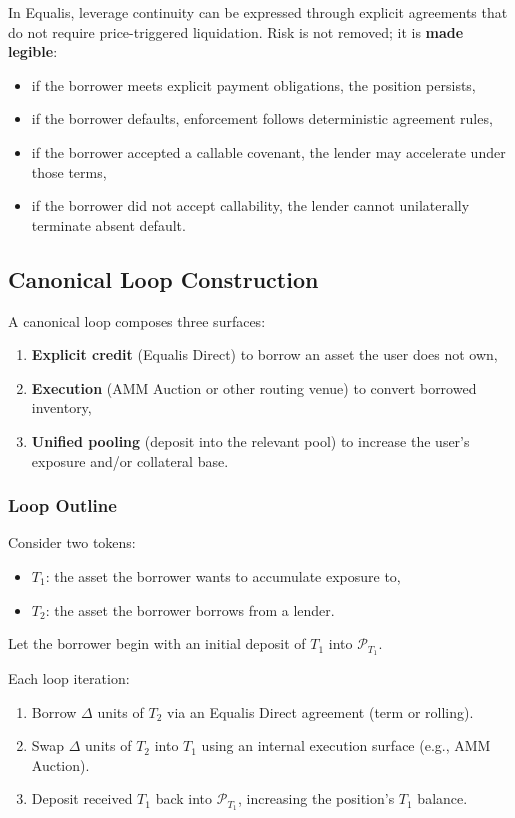 \documentclass[version=preprint]{iacrcc}
\begin{document}
In Equalis, leverage continuity can be expressed through explicit agreements that do not require price-triggered liquidation. Risk is not removed; it is \textbf{made legible}:
\begin{itemize}
  \item if the borrower meets explicit payment obligations, the position persists,
  \item if the borrower defaults, enforcement follows deterministic agreement rules,
  \item if the borrower accepted a callable covenant, the lender may accelerate under those terms,
  \item if the borrower did not accept callability, the lender cannot unilaterally terminate absent default.
\end{itemize}

\subsection{Canonical Loop Construction}

A canonical loop composes three surfaces:
\begin{enumerate}
  \item \textbf{Explicit credit} (Equalis Direct) to borrow an asset the user does not own,
  \item \textbf{Execution} (AMM Auction or other routing venue) to convert borrowed inventory,
  \item \textbf{Unified pooling} (deposit into the relevant pool) to increase the user’s exposure and/or collateral base.
\end{enumerate}

\subsubsection{Loop Outline}

Consider two tokens:
\begin{itemize}
  \item $T_1$: the asset the borrower wants to accumulate exposure to,
  \item $T_2$: the asset the borrower borrows from a lender.
\end{itemize}

Let the borrower begin with an initial deposit of $T_1$ into $\mathcal{P}_{T_1}$.

Each loop iteration:
\begin{enumerate}
  \item Borrow $\Delta$ units of $T_2$ via an Equalis Direct agreement (term or rolling).
  \item Swap $\Delta$ units of $T_2$ into $T_1$ using an internal execution surface (e.g., AMM Auction).
  \item Deposit received $T_1$ back into $\mathcal{P}_{T_1}$, increasing the position’s $T_1$ balance.
\end{enumerate}
\end{document}
